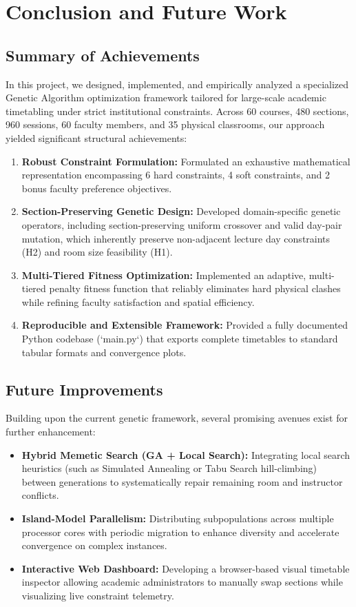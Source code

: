 
\chapter{Conclusion and Future Work}

\section{Summary of Achievements}
In this project, we designed, implemented, and empirically analyzed a specialized Genetic Algorithm optimization framework tailored for large-scale academic timetabling under strict institutional constraints. Across 60 courses, 480 sections, 960 sessions, 60 faculty members, and 35 physical classrooms, our approach yielded significant structural achievements:
\begin{enumerate}[leftmargin=1.5em]
  \item \textbf{Robust Constraint Formulation:} Formulated an exhaustive mathematical representation encompassing 6 hard constraints, 4 soft constraints, and 2 bonus faculty preference objectives.
  \item \textbf{Section-Preserving Genetic Design:} Developed domain-specific genetic operators, including section-preserving uniform crossover and valid day-pair mutation, which inherently preserve non-adjacent lecture day constraints (H2) and room size feasibility (H1).
  \item \textbf{Multi-Tiered Fitness Optimization:} Implemented an adaptive, multi-tiered penalty fitness function that reliably eliminates hard physical clashes while refining faculty satisfaction and spatial efficiency.
  \item \textbf{Reproducible and Extensible Framework:} Provided a fully documented Python codebase (`main.py`) that exports complete timetables to standard tabular formats and convergence plots.
\end{enumerate}

\section{Future Improvements}
Building upon the current genetic framework, several promising avenues exist for further enhancement:
\begin{itemize}[leftmargin=1.5em]
  \item \textbf{Hybrid Memetic Search (GA + Local Search):} Integrating local search heuristics (such as Simulated Annealing or Tabu Search hill-climbing) between generations to systematically repair remaining room and instructor conflicts.
  \item \textbf{Island-Model Parallelism:} Distributing subpopulations across multiple processor cores with periodic migration to enhance diversity and accelerate convergence on complex instances.
  \item \textbf{Interactive Web Dashboard:} Developing a browser-based visual timetable inspector allowing academic administrators to manually swap sections while visualizing live constraint telemetry.
\end{itemize}
